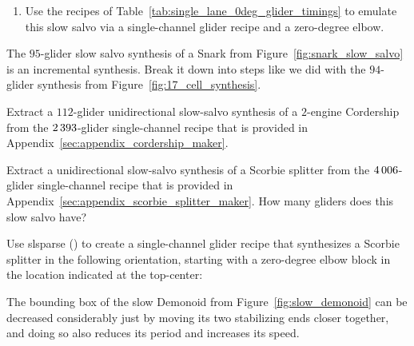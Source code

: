 \begin{multicols}{2}
\begin{problem}
\begin{enumerate}[label=\bf\color{ocre}(\alph*)]
			\item Use the recipes of Table~\ref{tab:single_lane_0deg_glider_timings} to emulate this slow salvo via a single-channel glider recipe and a zero-degree elbow.
		\end{enumerate}
	\end{problem}
	
	
	\mfilbreak
	
	
	\begin{problem}\label{exer:snark_slow_salvo_pieces}
		The $95$-glider slow salvo synthesis of a Snark from Figure~\ref{fig:snark_slow_salvo} is an incremental synthesis. Break it down into steps like we did with the $94$-glider synthesis from Figure~\ref{fig:17_cell_synthesis}.
	\end{problem}
	
	
	\mfilbreak
	
	
	\begin{problem}\label{exer:cordership_slow_salvo_from_single_channel}
		Extract a $112$-glider unidirectional slow-salvo synthesis of a $2$-engine Cordership from the $2{\,}393$-glider single-channel recipe that is provided in Appendix~\ref{sec:appendix_cordership_maker}.
	\end{problem}


	\mfilbreak
	
	
	\begin{problemstar}\label{exer:scorbie_splitter_slow_salvo}
		Extract a unidirectional slow-salvo synthesis of a Scorbie splitter from the $4{\,}006$-glider single-channel recipe that is provided in Appendix~\ref{sec:appendix_scorbie_splitter_maker}. How many gliders does this slow salvo have?
	\end{problemstar}
	
	
	\mfilbreak
	
	
	\begin{problem}\label{exer:scorbie_splitter_zero_degree}
		Use slsparse () to create a single-channel glider recipe that synthesizes a Scorbie splitter in the following orientation, starting with a zero-degree elbow block in the location indicated at the top-center:
		
		\noindent\begin{center}
		\end{center}
	\end{problem}
	
	
	\mfilbreak
	
	
	\begin{problemstar}\label{exer:slow_demonoid_adjust}
		The bounding box of the slow Demonoid from Figure~\ref{fig:slow_demonoid} can be decreased considerably just by moving its two stabilizing ends closer together, and doing so also reduces its period and increases its speed.
		

\end{problemstar}
\end{multicols}
